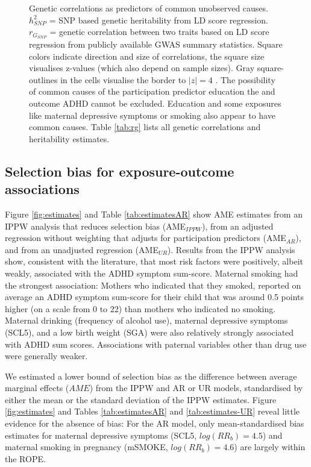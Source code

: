 \documentclass[12pt]{article}
\begin{document}
\begin{figure}
	\begin{center}
	\end{center}
	\caption{Genetic correlations as predictors of common unobserved causes. $h^2_{SNP}$ = SNP based genetic heritability from LD score regression. $r_{G_{SNP}}$ = genetic correlation between two traits based on LD score regression from publicly available GWAS summary statistics. Square colors indicate direction and size of correlations, the square size visualises z-values (which also depend on sample sizes). Gray square-outlines in the cells visualise the border to $|z|=4$ . The possibility of common causes of the participation predictor education the and outcome ADHD cannot be excluded. Education and some exposures like maternal depressive symptoms or smoking also appear to have common causes. Table \ref{tab:rg} lists all genetic correlations and heritability estimates.}
	\label{fig:rg}
\end{figure}

\subsection*{Selection bias for exposure-outcome associations}
Figure \ref{fig:estimates} and Table \ref{tab:estimatesAR} show AME estimates from an IPPW analysis that reduces selection bias (AME$_{IPPW}$), from an adjusted regression without weighting that adjusts for participation predictors (AME$_{AR}$), and from an unadjusted regression (AME$_{UR}$). Results from the IPPW analysis show, consistent with the literature, that most risk factors were positively, albeit weakly, associated with the ADHD symptom sum-score. Maternal smoking had the strongest association: Mothers who indicated that they smoked, reported on average an ADHD symptom sum-score for their child that was around 0.5 points higher (on a scale from 0 to 22) than mothers who indicated no smoking. Maternal drinking (frequency of alcohol use), maternal depressive symptoms (SCL5), and a low birth weight (SGA) were also relatively strongly associated with ADHD sum scores. Associations with paternal variables other than drug use were generally weaker.

We estimated a lower bound of selection bias as the difference between average marginal effects ($AME$) from the IPPW and AR or UR models, standardised by either the mean or the standard deviation of the IPPW estimates. Figure \ref{fig:estimates} and Tables \ref{tab:estimatesAR} and \ref{tab:estimates-UR} reveal little evidence for the absence of bias: For the AR model, only mean-standardised bias estimates for maternal depressive symptoms (SCL5, $log(RR_b)=4.5$) and maternal smoking in pregnancy (mSMOKE, $log(RR_b)=4.6$) are largely within the ROPE. 
\end{document}
